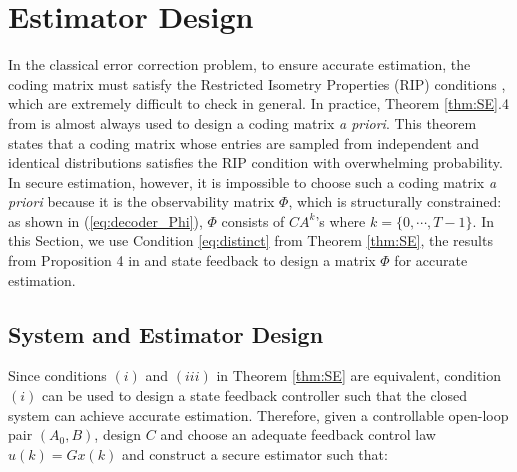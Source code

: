 \documentclass[../../thesis.tex]{subfiles}
\begin{document}


\section{Estimator Design}\label{sec:design}

In the classical error correction problem, to ensure accurate estimation, the coding matrix must satisfy the Restricted Isometry Properties (RIP) conditions  \cite{tao11}, which are extremely difficult to check in general. In practice, Theorem \ref{thm:SE}.4 from\cite{tao11} is almost always used to design a coding matrix {\it a priori}. This theorem states that a coding matrix whose entries are sampled from independent and identical distributions satisfies the RIP condition with overwhelming probability. 
In secure estimation, however, it is impossible to choose such a coding matrix {\it a priori} because it is the observability matrix $\Phi$, which is structurally constrained: as shown in (\ref{eq:decoder_Phi}), $\Phi$ consists of $CA^{k}$'s where $k=\{0, \cdots, T-1\}$. In this Section, we use Condition \ref{eq:distinct} from Theorem \ref{thm:SE}, the results from Proposition 4 in \cite{Fawzi:2014} and state feedback to design a matrix $\Phi$ for accurate estimation. 




\subsection{System and Estimator Design}\label{sec:decoder_design}

Since conditions $(i)$ and $(iii)$ in Theorem \ref{thm:SE} are equivalent, condition $(i)$ can be used to design a state feedback controller such that the closed system can achieve accurate estimation. Therefore, given a controllable open-loop pair $(A_0,B)$, design $C$ and choose an adequate feedback control law $u(k) = G x(k)$ and construct a secure estimator such that:
\end{document}
